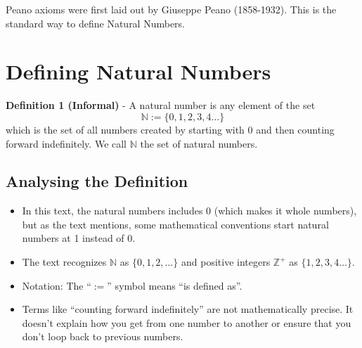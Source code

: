 \documentclass{article}
\begin{document}
Peano axioms were first laid out by Giuseppe Peano (1858-1932). This is the standard way to define Natural Numbers.

\section{Defining Natural Numbers}

\textbf{Definition 1 (Informal)} - A natural number is any element of the set
\[
    \mathbb{N} := \{0, 1, 2, 3, 4 \ldots \}
\]
which is the set of all numbers created by starting with 0 and then counting forward indefinitely. We call $\mathbb{N}$ the set of natural numbers.

\subsection*{Analysing the Definition}

\begin{itemize}
    \item In this text, the natural numbers includes 0 (which makes it whole numbers), but as the text mentions, some mathematical conventions start natural numbers at 1 instead of 0.

    \item The text recognizes $\mathbb{N}$ as $\{0, 1, 2, \ldots\}$ and positive integers $\mathbb{Z}^+$ as $\{1, 2, 3, 4 \ldots\}$.

    \item Notation: The ``$:=$'' symbol means ``is defined as''.

    \item Terms like ``counting forward indefinitely'' are not mathematically precise. It doesn't explain how you get from one number to another or ensure that you don't loop back to previous numbers.
\end{itemize}
\end{document}
